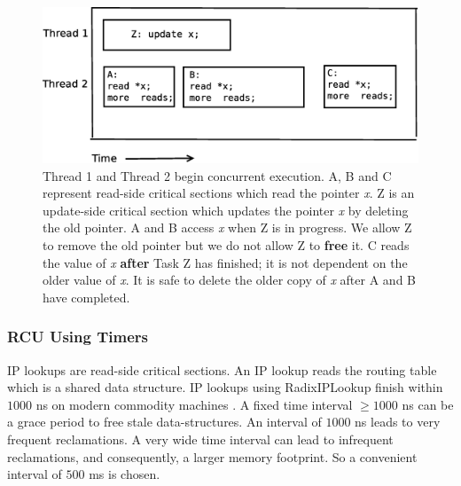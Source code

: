 \documentclass[a4paper]{article}
\begin{document}
\begin{figure}[float=tph]
\begin{center}
\includegraphics[scale=0.4]{../images/diagrams/rcuexp0}
\caption{Thread 1 and Thread 2 begin concurrent execution. A, B and C represent read-side critical sections which read the pointer \emph{x}. Z is an update-side critical section which updates the pointer \emph{x} by deleting the old pointer. A and B access \emph{x} when Z is in progress. We allow Z to remove the old pointer but we do not allow Z to \textbf{free} it. C reads the value of \emph{x} \textbf{after} Task Z has finished; it is not dependent on the older value of \emph{x}. It is safe to delete the older copy of \emph{x} after A and B have completed.}
\label{fig:rcuexp1} 
\end{center}
\end{figure}

\pagebreak

\subsubsection{RCU Using Timers}
\label{sec:rcutimers}
IP lookups are read-side critical sections. An IP lookup reads the routing table which is a shared data structure. IP lookups using RadixIPLookup finish within $1000$ ns on modern commodity machines \cite{lookuptime}. A fixed time interval $\ge 1000$ ns can be a grace period to free stale data-structures. An interval of $1000$ ns leads to very frequent reclamations. A very wide time interval can lead to infrequent reclamations, and consequently, a larger memory footprint. So a convenient interval of $500$ ms is chosen.\\ 
\end{document}

